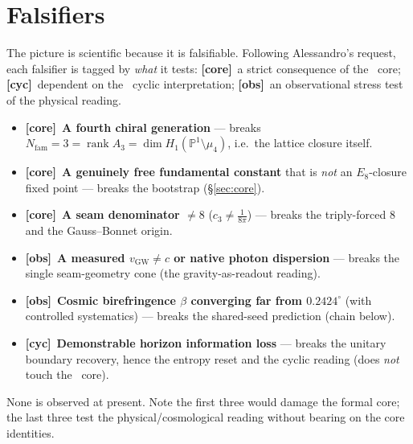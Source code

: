 \documentclass[11pt,a4paper]{article}
\newcommand{\fcore}{{\small\textcolor{tfgreen!50!black}{\textbf{[core]}}}}
\newcommand{\fcyc}{{\small\textcolor{tfgold!75!black}{\textbf{[cyc]}}}}
\newcommand{\fobs}{{\small\textcolor{tfblue!70!black}{\textbf{[obs]}}}}
\newcommand{\cthree}{c_3}
\newcommand{\Nfam}{N_{\mathrm{fam}}}
\begin{document}
\section{Falsifiers}\label{sec:falsify}
The picture is scientific because it is falsifiable. Following Alessandro's request, each falsifier is
tagged by \emph{what} it tests: \fcore\ a strict consequence of the \mE\ core; \fcyc\ dependent on the
\mC\ cyclic interpretation; \fobs\ an observational stress test of the physical reading.

\begin{itemize}[leftmargin=1.4em]
\item \fcore\ \textbf{A fourth chiral generation} --- breaks $\Nfam=3=\operatorname{rank}A_3=\dim H_1(\mathbb P^1\setminus\mu_4)$, i.e.\ the lattice closure itself.
\item \fcore\ \textbf{A genuinely free fundamental constant} that is \emph{not} an $E_8$-closure fixed point --- breaks the bootstrap (\S\ref{sec:core}).
\item \fcore\ \textbf{A seam denominator $\neq8$} ($\cthree\neq\tfrac1{8\pi}$) --- breaks the triply-forced $8$ and the Gauss--Bonnet origin.
\item \fobs\ \textbf{A measured $v_{\mathrm{GW}}\neq c$ or native photon dispersion} --- breaks the single seam-geometry cone (the gravity-as-readout reading).
\item \fobs\ \textbf{Cosmic birefringence $\beta$ converging far from $0.2424^\circ$} (with controlled systematics) --- breaks the shared-seed prediction (chain below).
\item \fcyc\ \textbf{Demonstrable horizon information loss} --- breaks the unitary boundary recovery, hence the entropy reset and the cyclic reading (does \emph{not} touch the \mE\ core).
\end{itemize}
None is observed at present. Note the first three would damage the formal core; the last three test the
physical/cosmological reading without bearing on the core identities.
\end{document}
